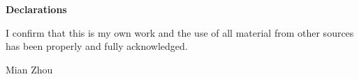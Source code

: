 
\begin{center}
\LARGE \textbf{Declarations} \normalsize
\end{center}

\small

{\parindent 0pt
I confirm that this is my own work and the use of all material from other sources has been properly and fully acknowledged.\\ %


\vspace*{2cm}


\begin{flushright}
   Mian Zhou
  \end{flushright}
}

